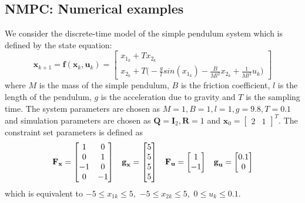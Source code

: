 \documentclass{article}
\begin{document}
\subsection{NMPC: Numerical examples}
We consider the discrete-time model of the simple pendulum system which is defined by the state equation:
\begin{equation}
\textbf{x}_{k+1}=\textbf{f}(\textbf{x}_{k},\textbf{u}_{k})=\left[\begin{matrix}x_{1_k}+T x_{2_k}\\x_{2_k}+T\big(-\frac{g}{l}sin(x_{1_k})-\frac{B}{Ml^{2}}x_{2_k}+\frac{1}{Ml^{2}}u_k\big) \end{matrix}\right]
\end{equation}
where $M$ is the mass of the simple pendulum, $B$ is the friction coefficient, $l$ is the length of the pendulum, $g$ is the acceleration due to gravity and $T$ is the sampling time. The system parameters are chosen as $M=1,B=1,l=1,g=9.8,T=0.1$ and simulation parameters are chosen as $\textbf{Q}=\textbf{I}_{2},\textbf{R}=1$ and $\textbf{x}_{0}=\left[\begin{matrix} 2 & 1
\end{matrix}\right]^{T}.$ The constraint set parameters is defined as 
\begin{equation}
    \textbf{F}_{\textbf{x}}=\left[\begin{matrix} 1 &0 \\0 & 1\\-1 &0 \\0&-1
\end{matrix}\right] \hspace{0.3cm} \textbf{g}_{\textbf{x}}=\left[\begin{matrix} 5 \\5\\5\\5
\end{matrix}\right]\hspace{0.3cm} \textbf{F}_{\textbf{u}}=\left[\begin{matrix} 1\\-1 \end{matrix} \right] \hspace{0.3cm} \textbf{g}_{\textbf{u}}=\left[\begin{matrix} 0.1\\0 \end{matrix} \right]
\end{equation}
which is equivalent to $-5 \leq x_{1k} \leq 5,$ $-5 \leq x_{2k} \leq 5,$ $0 \leq u_{k} \leq 0.1.$
\end{document}

